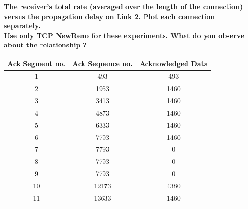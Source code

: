 \documentclass[11pt]{article}
\numberwithin{equation}{section}
\begin{document}
\textbf{The receiver's total rate (averaged over the length of the connection) versus the propagation delay on Link 2. Plot each connection separately. }\\

\textbf{Use only TCP NewReno for these experiments. What do you observe about the relationship ? }\\








































\begin{table}[H]
\begin{center}
    \begin{tabular}{|c|c|c|}
    \hline
    Ack Segment no. & Ack Sequence no. & Acknowledged Data\\ \hline
 
    1 & 493 & 493\\ \hline
    2 & 1953 & 1460  \\ \hline
    3 & 3413 & 1460\\ \hline
    4 & 4873 & 1460\\ \hline
    5 & 6333 & 1460 \\ \hline
    6 & 7793 & 1460\\ \hline
    7 & 7793 & 0\\ \hline  
    8 & 7793 & 0\\ \hline 
    9 & 7793 & 0\\ \hline
    10 & 12173 & 4380\\ \hline 
    11 & 13633 & 1460\\ \hline
    \end{tabular}
\end{center}
\end{table}
\end{document}
